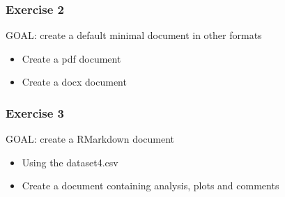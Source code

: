 \documentclass{beamer}
\begin{document}
\begin{frame}
    \frametitle{Exercise 2}
    {\sc GOAL: create a default minimal document in other formats}
    \begin{itemize}
        \item Create a pdf document
        \item Create a docx document
    \end{itemize}
\end{frame}

\begin{frame}
    \frametitle{Exercise 3}
    {\sc GOAL: create a RMarkdown document}
    \begin{itemize}
        \item Using the dataset4.csv
        \item Create a document containing analysis, plots and comments
    \end{itemize}
\end{frame}
\end{document}
